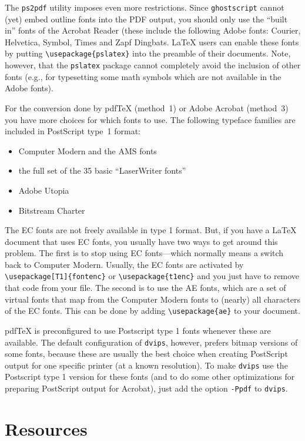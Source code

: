 \documentclass[11pt,a4paper]{article}
\begin{document}
The \texttt{ps2pdf} utility imposes even more restrictions. Since
\texttt{ghostscript} cannot (yet) embed outline fonts into the PDF
output, you should only use the ``built in'' fonts of the Acrobat
Reader (these include the following Adobe fonts: Courier, Helvetica,
Symbol, Times and Zapf Dingbats. \LaTeX{} users can enable these fonts
by putting \verb+\usepackage{pslatex}+ into the preamble of their
documents. Note, however, that the \verb+pslatex+ package cannot completely
avoid the inclusion of other fonts (e.g., for typesetting some math
symbols which are not available in the Adobe fonts).

For the conversion done by pdf\TeX{} (method~1) or Adobe
Acrobat (method~3) you have more choices for which fonts to use. The
following typeface families are included in PostScript type~1 format:
\begin{itemize}
\item Computer Modern and the AMS fonts
\item the full set of the 35 basic ``LaserWriter fonts''
\item Adobe Utopia
\item Bitstream Charter
\end{itemize}
The EC fonts are not freely available in type 1 format. But, if you
have a \LaTeX{} document that uses EC fonts, you usually have two
ways to get around this problem. The first is to stop using
EC fonts---which normally means a switch back to Computer Modern. Usually, the
EC fonts are activated by \verb+\usepackage[T1]{fontenc}+ or
\verb+\usepackage{t1enc}+ and you just have to remove that code from
your file. The second is to use the AE fonts, which are a set of
virtual fonts that map from the Computer Modern fonts to (nearly) all
characters of the EC fonts. This can be done by adding
\verb+\usepackage{ae}+ to your document.

pdf\TeX{} is preconfigured to use Postscript type 1 fonts whenever
these are available. The default configuration of \texttt{dvips},
however, prefers bitmap versions of some fonts, because these are
usually the best choice when creating PostScript output for one
specific printer (at a known resolution). To make \texttt{dvips} use
the Postscript type 1 version for these fonts (and to do some other
optimizations for preparing PostScript output for Acrobat), just add
the option \texttt{-Ppdf} to \texttt{dvips}.

\section{Resources}
\end{document}

